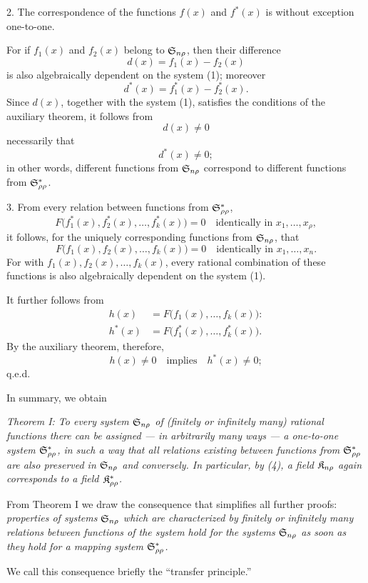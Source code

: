 \documentclass[11pt]{article}
\begin{document}
2. The correspondence of the functions $f(x)$ and $f^*(x)$ is without exception one-to-one.

For if $f_1(x)$ and $f_2(x)$ belong to $\mathfrak{S}_{n\rho}$, then their difference
\[
  d(x)=f_1(x)-f_2(x)
\]
is also algebraically dependent on the system (1); moreover
\[
  d^*(x)=f_1^*(x)-f_2^*(x).
\]
Since $d(x)$, together with the system (1), satisfies the conditions of the auxiliary theorem, it follows from
\[
  d(x)\ne0
\]
necessarily that
\[
  d^*(x)\ne0;
\]
in other words, different functions from $\mathfrak{S}_{n\rho}$ correspond to different functions from $\mathfrak{S}^*_{\rho\rho}$.

3. From every relation between functions from $\mathfrak{S}^*_{\rho\rho}$,
\[
  F\bigl(f_1^*(x),f_2^*(x),\ldots,f_k^*(x)\bigr)=0
  \quad\text{identically in }x_1,\ldots,x_\rho,
\]
it follows, for the uniquely corresponding functions from $\mathfrak{S}_{n\rho}$, that
\[
  F\bigl(f_1(x),f_2(x),\ldots,f_k(x)\bigr)=0
  \quad\text{identically in }x_1,\ldots,x_n.
\]
For with $f_1(x),f_2(x),\ldots,f_k(x)$, every rational combination of these functions is also algebraically dependent on the system (1).

It further follows from
\begin{equation}
\begin{aligned}
 h(x)&=F\bigl(f_1(x),\ldots,f_k(x)\bigr):\\
 h^*(x)&=F\bigl(f_1^*(x),\ldots,f_k^*(x)\bigr).
\end{aligned}
\tag{4}
\end{equation}
By the auxiliary theorem, therefore,
\[
  h(x)\ne0\quad\text{implies}\quad h^*(x)\ne0;
\]
q.e.d.

In summary, we obtain

\emph{Theorem I: To every system $\mathfrak{S}_{n\rho}$ of (finitely or infinitely many) rational functions there can be assigned --- in arbitrarily many ways --- a one-to-one system $\mathfrak{S}^*_{\rho\rho}$, in such a way that all relations existing between functions from $\mathfrak{S}^*_{\rho\rho}$ are also preserved in $\mathfrak{S}_{n\rho}$ and conversely. In particular, by (4), a field $\mathfrak{K}_{n\rho}$ again corresponds to a field $\mathfrak{K}^*_{\rho\rho}$.}

From Theorem I we draw the consequence that simplifies all further proofs: \emph{properties of systems $\mathfrak{S}_{n\rho}$ which are characterized by finitely or infinitely many relations between functions of the system hold for the systems $\mathfrak{S}_{n\rho}$ as soon as they hold for a mapping system $\mathfrak{S}^*_{\rho\rho}$.}

We call this consequence briefly the ``transfer principle.''
\end{document}
